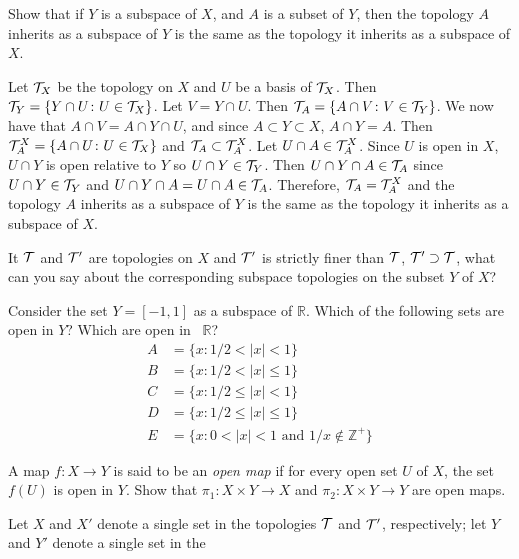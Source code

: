\begin{exercise}
\item
  Show that if \(Y\) is a subspace of \(X\), and \(A\) is a subset of \(Y\),
  then the topology \(A\) inherits as a subspace of \(Y\) is the same as the
  topology it inherits as a subspace of \(X\).
  \par\smallskip
  Let \(\mathcal{T}_X\) be the topology on \(X\) and \(U\) be a basis of \(\mathcal{T}_X\).
  Then \(\mathcal{T}_Y = \{Y\cap U\colon U\in\mathcal{T}_X\}\).
  Let \(V = Y\cap U\).
  Then \(\mathcal{T}_A = \{A\cap V\colon V\in\mathcal{T}_Y\}\).
  We now have that \(A\cap V = A\cap Y\cap U\), and since
  \(A\subset Y\subset X\), \(A\cap Y = A\).
  Then \(\mathcal{T}_A^X = \{A\cap U\colon U\in \mathcal{T}_X\}\) and
  \(\mathcal{T}_A\subset\mathcal{T}_A^X\).
  Let \(U\cap A\in\mathcal{T}_A^X\).
  Since \(U\) is open in \(X\), \(U\cap Y\) is open relative to \(Y\) so
  \(U\cap Y\in\mathcal{T}_Y\).
  Then \(U\cap Y\cap A\in\mathcal{T}_A\) since \(U\cap Y\in\mathcal{T}_Y\) and
  \(U\cap Y\cap A = U\cap A\in\mathcal{T}_A\).
  Therefore, \(\mathcal{T}_A = \mathcal{T}_A^X\) and the topology \(A\) inherits as a
  subspace of \(Y\) is the same as the topology it inherits as a subspace of
  \(X\).
\item
  It \(\mathcal{T}\) and \(\mathcal{T}'\) are topologies on \(X\) and \(\mathcal{T}'\) is strictly
  finer than \(\mathcal{T}\), \(\mathcal{T}'\supset\mathcal{T}\), what can you say about the
  corresponding subspace topologies on the subset \(Y\) of \(X\)?\
\item
  Consider the set \(Y = [-1,1]\) as a subspace of \(\mathbb{R}\).
  Which of the following sets are open in \(Y\)? Which are open in \
  \(\mathbb{R}\)?
  \begin{align*}
    A & = \{x\colon 1/2 < \lvert x\rvert < 1\}\\
    B & = \{x\colon 1/2 < \lvert x\rvert\leq 1\}\\
    C & = \{x\colon 1/2\leq \lvert x\rvert < 1\}\\
    D & = \{x\colon 1/2\leq \lvert x\rvert\leq 1\}\\
    E & = \{x\colon 0 < \lvert x\rvert < 1\text{ and } 1/x\not\in\mathbb{Z}^+\}
  \end{align*}
\item
  A map \(f\colon X\to Y\) is said to be an \textit{open map} if for every open
  set \(U\) of \(X\), the set \(f(U)\) is open in \(Y\).
  Show that \(\pi_1\colon X\times Y\to X\) and \(\pi_2\colon X\times Y\to Y\)
  are open maps.
\item
  Let \(X\) and \(X'\) denote a single set in the topologies \(\mathcal{T}\) and
  \(\mathcal{T}'\), respectively; let \(Y\) and \(Y'\) denote a single set in the

\end{exercise}

